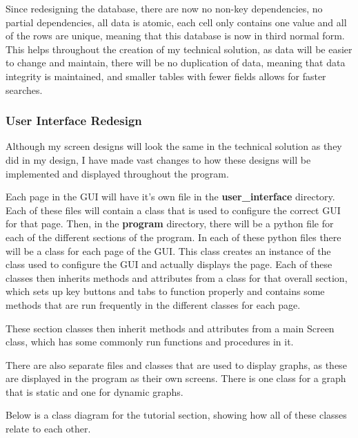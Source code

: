 \documentclass{article}
\begin{document}
Since redesigning the database, there are now no non-key dependencies, no partial dependencies, all data is atomic, each cell only contains one value and all of the rows are unique, meaning that this database is now in third normal form. This helps throughout the creation of my technical solution, as data will be easier to change and maintain, there will be no duplication of data, meaning that data integrity is maintained, and smaller tables with fewer fields allows for faster searches.

\subsubsection{User Interface Redesign}
Although my screen designs will look the same in the technical solution as they did in my design, I have made vast changes to how these designs will be implemented and displayed throughout the program.

Each page in the GUI will have it's own file in the \textbf{user\_interface} directory. Each of these files will contain a class that is used to configure the correct GUI for that page. Then, in the \textbf{program} directory, there will be a python file for each of the different sections of the program. In each of these python files there will be a class for each page of the GUI. This class creates an instance of the class used to configure the GUI and actually displays the page. Each of these classes then inherits methods and attributes from a class for that overall section, which sets up key buttons and tabs to function properly and contains some methods that are run frequently in the different classes for each page.

These section classes then inherit methods and attributes from a main Screen class, which has some commonly run functions and procedures in it.

There are also separate files and classes that are used to display graphs, as these are displayed in the program as their own screens. There is one class for a graph that is static and one for dynamic graphs.

Below is a class diagram for the tutorial section, showing how all of these classes relate to each other.
\end{document}
